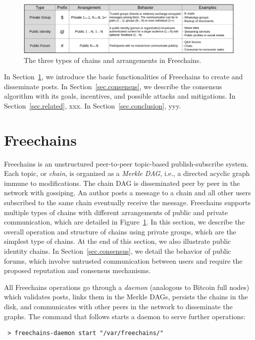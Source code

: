 \documentclass[10pt,journal,compsoc]{IEEEtran}
\newcommand{\FC}       {Freechains\xspace}
\begin{document}
\begin{figure}[ht]
\centering
\includegraphics[width=\textwidth]{arrangements.png}
\caption{The three types of chains and arrangements in \FC.}
\label{fig.table}
\end{figure}

In Section~\ref{sec.freechains}, we introduce the basic functionalities of \FC
to create and disseminate posts.
In Section~\ref{sec.consensus}, we describe the consensus algorithm with its
goals, incentives, and possible attacks and mitigations.
In Section~\ref{sec.related}, xxx.
In Section~\ref{sec.conclusion}, yyy.

\section{Freechains}
\label{sec.freechains}

\FC is an unstructured peer-to-peer topic-based publish-subscribe system.
Each topic, or \emph{chain}, is organized as a \emph{Merkle DAG}, i.e., a
directed acyclic graph immune to modifications.
The chain DAG is disseminated peer by peer in the network with gossiping.
An author posts a message to a chain and all other users subscribed to the same
chain eventually receive the message.
\FC supports multiple types of chains with different arrangements of public and
private communication, which are detailed in Figure~\ref{fig.table}.
In this section, we describe the overall operation and structure of chains
using private groups, which are the simplest type of chains.
At the end of this section, we also illustrate public identity chains.
In Section~\ref{sec.consensus}, we detail the behavior of public forums, which
involve untrusted communication between users and require the proposed
reputation and consensus mechanisms.

All \FC operations go through a \emph{daemon} (analogous to Bitcoin full nodes)
which validates posts, links them in the Merkle DAGs, persists the chains in
the disk, and communicates with other peers in the network to disseminate the
graphs.
The command that follows starts a daemon to serve further operations:

{\footnotesize
\begin{verbatim}
 > freechains-daemon start "/var/freechains/"
\end{verbatim}
}
\end{document}
